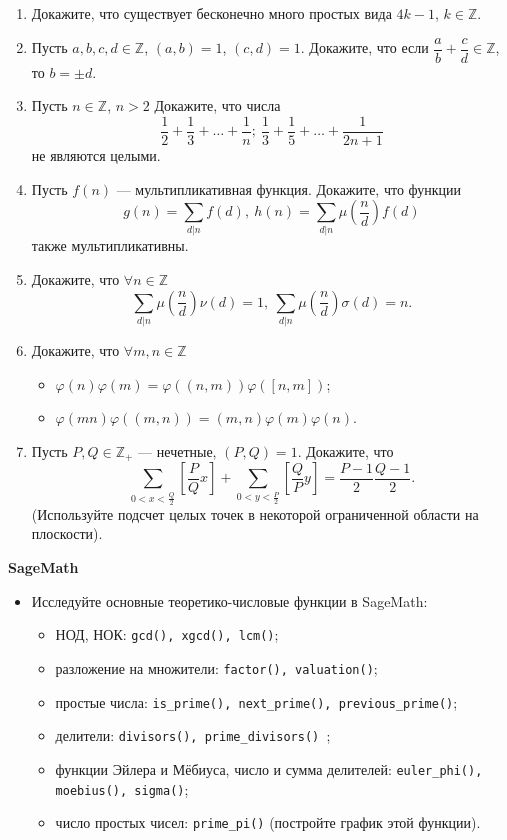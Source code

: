 \begin{enumerate}[topsep=0pt]
    \item Докажите, что существует бесконечно много простых вида $4k-1$, $k\in\mathbb{Z}$. %
    \item Пусть $a,b,c,d \in \mathbb{Z}$, $(a,b)=1$, $(c,d)=1$. Докажите, что если $\dfrac{a}{b}+\dfrac{c}{d} \in \mathbb{Z}$, то $b=\pm d$.
    \item Пусть $n \in \mathbb{Z}$, $n>2$ Докажите, что числа
    $$
    \dfrac{1}{2}+\dfrac{1}{3}+\dots+\dfrac{1}{n};\ 
        \dfrac{1}{3}+\dfrac{1}{5}+\dots+\dfrac{1}{2n+1}
    $$
    не являются целыми.
    \item Пусть $f(n)$ --- мультипликативная функция. Докажите, что функции
    $$
        g(n)=\sum\limits_{d|n} f(d),\ 
        h(n)=\sum\limits_{d|n} \mu(\frac{n}{d})f(d)
    $$
    также мультипликативны.
    \item Докажите, что $\forall n \in \mathbb{Z}$
    $$
    \sum\limits_{d|n} \mu(\frac{n}{d}) \nu(d) = 1,\ 
        \sum\limits_{d|n} \mu(\frac{n}{d}) \sigma(d) = n.
    $$
    \item Докажите, что $\forall m,n \in \mathbb{Z}$
    \begin{itemize}[noitemsep,topsep=0pt]
        \item $\varphi(n)\varphi(m)=\varphi((n,m))\varphi([n,m])$;
        \item $\varphi(mn)\varphi((m,n))=(m,n)\varphi(m)\varphi(n)$.
    \end{itemize}
    \item Пусть $P,Q\in\mathbb{Z}_+$ --- нечетные, $(P,Q)=1$. Докажите, что 
    $$
    \sum_{0<x<\frac{Q}{2}}\left[\frac{P}{Q}x\right] + \sum_{0<y<\frac{P}{2}}\left[\frac{Q}{P}y\right] = \frac{P-1}{2}\frac{Q-1}{2}.
    $$
    (Используйте подсчет целых точек в некоторой ограниченной области на плоскости).
    
\end{enumerate}

\noindent\textbf{SageMath}

\begin{itemize}[topsep=0pt]

    \item Исследуйте основные теоретико-числовые функции в SageMath:
    \begin{itemize}[noitemsep,topsep=0pt]
        \item НОД, НОК: \texttt{gcd(), xgcd(), lcm()};
        \item разложение на множители: \texttt{factor(), valuation()};
        \item простые числа: \texttt{is\_prime(), next\_prime(), previous\_prime()};
        \item делители: \texttt{divisors(), prime\_divisors() };
        \item функции Эйлера и Мёбиуса, число и сумма делителей: \texttt{euler\_phi(), moebius(), sigma()};
        \item число простых чисел: \texttt{prime\_pi()} (постройте график этой функции).
    \end{itemize}
    
\end{itemize}

